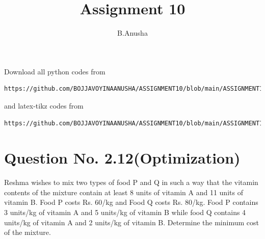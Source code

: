\documentclass[journal,12pt,twocolumn]{IEEEtran}
\begin{document}
\makeatother
\let\StandardTheFigure\thefigure
\let\vec\mathbf
\renewcommand{\thefigure}{\theproblem}
\def\putbox#1#2#3{\makebox[0in][l]{\makebox[#1][l]{}\raisebox{\baselineskip}[0in][0in]{\raisebox{#2}[0in][0in]{#3}}}}
     \def\rightbox#1{\makebox[0in][r]{#1}}
     \def\centbox#1{\makebox[0in]{#1}}
     \def\topbox#1{\raisebox{-\baselineskip}[0in][0in]{#1}}
     \def\midbox#1{\raisebox{-0.5\baselineskip}[0in][0in]{#1}}
\vspace{3cm}
\title{Assignment 10}
\author{B.Anusha}
\maketitle
\newpage
\bigskip
\renewcommand{\thefigure}{\theenumi}
\renewcommand{\thetable}{\theenumi}
Download all python codes from 
\begin{lstlisting}
https://github.com/BOJJAVOYINAANUSHA/ASSIGNMENT10/blob/main/ASSIGNMENT10/assignment10.py
\end{lstlisting}
%
and latex-tikz codes from 
%
\begin{lstlisting}
https://github.com/BOJJAVOYINAANUSHA/ASSIGNMENT10/blob/main/ASSIGNMENT10/ASSIGNMENT10.tex
\end{lstlisting}
%
\section{Question No. 2.12(Optimization)}
Reshma wishes to mix two types of food P and Q in such a way that the vitamin contents of the mixture contain at least 8 units of vitamin A and 11 units of vitamin B. Food P costs Rs. 60/kg and Food Q costs Rs. 80/kg. Food P contains 3 units/kg of vitamin A and 5 units/kg of vitamin B while food Q contains 4 units/kg of vitamin A and 2 units/kg of vitamin B. Determine the minimum cost of the mixture.
\end{document}
